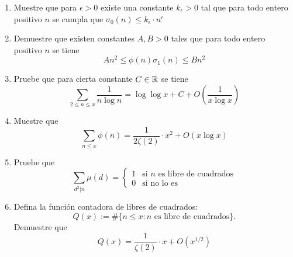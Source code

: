 \begin{enumerate}[label=\textbf{Problema \arabic*.}]
    \item Muestre que para $\epsilon>0$ existe una constante $k_\epsilon>0$ tal que para todo entero positivo $n$ se cumpla que $\sigma_0(n)\leq k_\epsilon\cdot n^\epsilon$
    \begin{sol}
        
    \end{sol}

    \item Demuestre que existen constantes $A,B > 0$ tales que para todo entero positivo $n$ se tiene
    \[An^2\leq\phi(n)\sigma_1(n)\leq Bn^2\]
    \begin{sol}
        
    \end{sol}

    \item Pruebe que para cierta constante $C \in \mathbb{R}$ se tiene
    \[\sum_{2\leq n\leq x}\frac{1}{n\log n}=\log\log x+C+O\left(\frac{1}{x\log x}\right)\]
    \begin{sol}
        
    \end{sol}

    \item Muestre que
    \[\sum_{n\leq x}\phi(n)=\frac{1}{2\zeta(2)}\cdot x^2+O(x\log x)\]
    \begin{sol}
        
    \end{sol}

    \item Pruebe que
    \[\sum_{d^2|n}\mu(d)=\begin{cases}
        1 &\text{si $n$ es libre de cuadrados}\\
        0 &\text{si no lo es}
    \end{cases}\]
    \begin{sol}
        
    \end{sol}

    \item Defina la función contadora de libres de cuadrados:
    \[Q(x):=\#\{n\leq x: n\text{ es libre de cuadrados}\}.\]
    Demuestre que
    \[Q(x)=\frac{1}{\zeta(2)}\cdot x+O(x^{1/2})\]
\end{enumerate}

